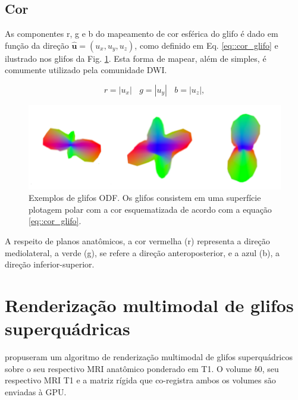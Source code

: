 \subsection{Cor}

As componentes r, g e b do mapeamento de cor esférica do glifo é dado em função da direção $\mathbf{\hat{u}} = (u_x, u_y, u_z)$, como definido em Eq. \ref{eq::cor_glifo} e ilustrado nos glifos da Fig. \ref{fig::glifo_ilustrado}. Esta forma de mapear, além de simples, é comumente utilizado pela comunidade DWI. %

\begin{equation}
\label{eq::cor_glifo}
    r = |u_x| ~~~~ g = |u_y| ~~~~ b = |u_z|, 
\end{equation}

\begin{figure}[ht]

    \centering
    \includegraphics[width=.8\linewidth, angle=0]{figs/Esquema_Glifo/Glifos3Ex.png}
    \caption{Exemplos de glifos ODF. Os glifos consistem em uma superfície plotagem polar com a cor esquematizada de acordo com a equação \ref{eq::cor_glifo}.}
    \label{fig::glifo_ilustrado}
   \hspace{1pt}
\end{figure}

A respeito de planos anatômicos, a cor vermelha (r) representa a direção mediolateral, a verde (g), se refere a direção anteroposterior, e a azul (b), a direção inferior-superior.



\section{Renderização multimodal de glifos superquádricas}
\label{sec::superquadricas}

 propuseram um algoritmo de renderização multimodal de glifos superquádricos sobre o seu respectivo MRI anatômico ponderado em T1. O volume $b0$, seu respectivo MRI T1 e a matriz rígida que co-registra ambos os volumes \cite{ting2014} são enviadas à GPU.

